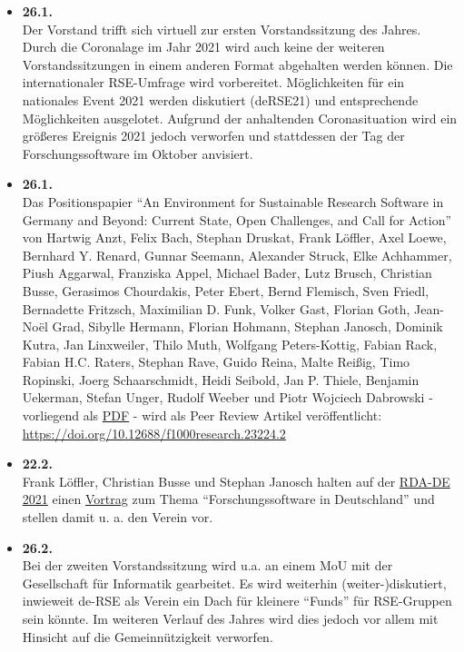 \begin{itemize}
 \item \textbf{26.1.}\\Der Vorstand trifft sich virtuell zur ersten Vorstandssitzung des Jahres. Durch die Coronalage im Jahr 2021 wird auch keine der weiteren Vorstandssitzungen in einem anderen Format abgehalten werden können. Die internationaler RSE-Umfrage wird vorbereitet. Möglichkeiten für ein nationales Event 2021 werden diskutiert (deRSE21) und entsprechende Möglichkeiten ausgelotet. Aufgrund der anhaltenden Coronasituation wird ein größeres Ereignis 2021 jedoch verworfen und stattdessen der Tag der Forschungssoftware im Oktober anvisiert.
 \item \textbf{26.1.}\\Das Positionspapier "`An Environment for Sustainable Research Software in Germany and Beyond: Current State, Open Challenges, and Call for Action"' von Hartwig Anzt, Felix Bach, Stephan Druskat, Frank Löffler, Axel Loewe, Bernhard Y. Renard, Gunnar Seemann, Alexander Struck, Elke Achhammer, Piush Aggarwal, Franziska Appel, Michael Bader, Lutz Brusch, Christian Busse, Gerasimos Chourdakis, Peter Ebert, Bernd Flemisch, Sven Friedl, Bernadette Fritzsch, Maximilian D. Funk, Volker Gast, Florian Goth, Jean-Noël Grad, Sibylle Hermann, Florian Hohmann, Stephan Janosch, Dominik Kutra, Jan Linxweiler, Thilo Muth, Wolfgang Peters-Kottig, Fabian Rack, Fabian H.C. Raters, Stephan Rave, Guido Reina, Malte Reißig, Timo Ropinski, Joerg Schaarschmidt, Heidi Seibold, Jan P. Thiele, Benjamin Uekerman, Stefan Unger, Rudolf Weeber und Piotr Wojciech Dabrowski - vorliegend als \href{https://github.com/DE-RSE/positions/blob/8304df05448f22ae4293bb06ad513bc69a4ccc00/001/manuscript.pdf}{PDF} - wird als Peer Review Artikel veröffentlicht: \href{https://doi.org/10.12688/f1000research.23224.2}{https://doi.org/10.12688/f1000research.23224.2}
\item \textbf{22.2.}\\Frank Löffler, Christian Busse und Stephan Janosch halten auf der \href{https://indico.desy.de/event/28294/contributions/94417/}{RDA-DE 2021} einen \href{http://doi.org/10.5281/zenodo.4564161}{Vortrag} zum Thema ``Forschungssoftware in Deutschland'' und stellen damit u. a. den Verein vor.
 \item \textbf{26.2.}\\Bei der zweiten Vorstandssitzung wird u.a. an einem MoU mit der Gesellschaft für Informatik gearbeitet. Es wird weiterhin (weiter-)diskutiert, inwieweit de-RSE als Verein ein Dach für kleinere ``Funds'' für RSE-Gruppen sein könnte. Im weiteren Verlauf des Jahres wird dies jedoch vor allem mit Hinsicht auf die Gemeinnützigkeit verworfen.

\end{itemize}
